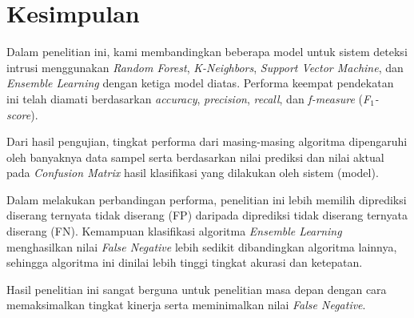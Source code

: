 \documentclass[conference]{IEEEtran}
\begin{document}
\section{Kesimpulan}

Dalam penelitian ini, kami membandingkan beberapa model untuk sistem deteksi intrusi menggunakan \emph{Random Forest}, \emph{K-Neighbors}, \emph{Support Vector Machine}, dan \emph{Ensemble  Learning} dengan ketiga model diatas. Performa keempat pendekatan ini telah diamati berdasarkan \emph{accuracy}, \emph{precision}, \emph{recall}, dan \emph{f-measure} (\emph{F$_1$-score}).

Dari hasil pengujian, tingkat performa dari masing-masing algoritma dipengaruhi oleh banyaknya data sampel serta berdasarkan nilai prediksi dan nilai aktual pada \emph{Confusion Matrix} hasil klasifikasi yang dilakukan oleh sistem (model).

Dalam melakukan perbandingan performa, penelitian ini lebih memilih diprediksi diserang ternyata tidak diserang (FP) daripada diprediksi tidak diserang ternyata diserang (FN).
Kemampuan klasifikasi algoritma \emph{Ensemble Learning} menghasilkan nilai \emph{False Negative} lebih sedikit dibandingkan algoritma lainnya,
sehingga algoritma ini dinilai lebih tinggi tingkat akurasi dan ketepatan.
 

Hasil penelitian ini sangat berguna untuk penelitian masa depan dengan cara memaksimalkan tingkat kinerja serta meminimalkan nilai \emph{False Negative}.




\vspace{12pt}
\end{document}
